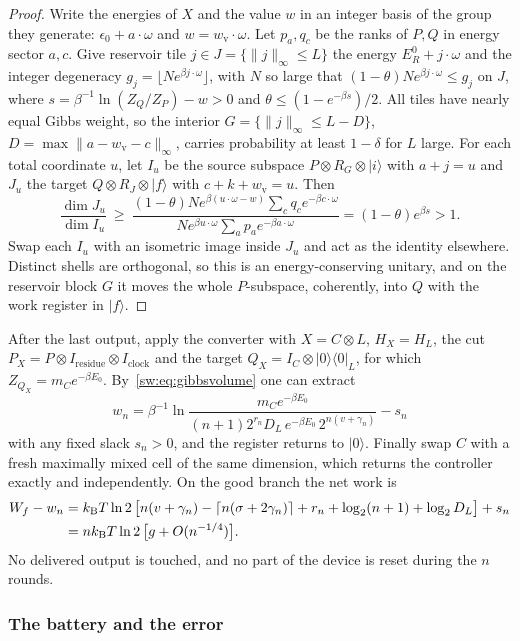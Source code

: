 \begin{proof}
Write the energies of $X$ and the value $w$ in an integer basis of the group they generate: $\epsilon_0+a\cdot\omega$ and $w=w_{\mathrm v}\cdot\omega$. Let $p_a,q_c$ be the ranks of $P,Q$ in energy sector $a,c$. Give reservoir tile $j\in J=\{\|j\|_\infty\le L\}$ the energy $E_R^0+j\cdot\omega$ and the integer degeneracy $g_j=\lfloor Ne^{\beta j\cdot\omega}\rfloor$, with $N$ so large that $(1-\theta)Ne^{\beta j\cdot\omega}\le g_j$ on $J$, where $s=\beta^{-1}\ln(Z_Q/Z_P)-w>0$ and $\theta\le(1-e^{-\beta s})/2$. All tiles have nearly equal Gibbs weight, so the interior $G=\{\|j\|_\infty\le L-D\}$, $D=\max\|a-w_{\mathrm v}-c\|_\infty$, carries probability at least $1-\delta$ for $L$ large. For each total coordinate $u$, let $I_u$ be the source subspace $P\otimes R_G\otimes|i\rangle$ with $a+j=u$ and $J_u$ the target $Q\otimes R_J\otimes|f\rangle$ with $c+k+w_{\mathrm v}=u$. Then
\[
\frac{\dim J_u}{\dim I_u}\ \ge\ \frac{(1-\theta)Ne^{\beta(u\cdot\omega-w)}\sum_cq_ce^{-\beta c\cdot\omega}}{Ne^{\beta u\cdot\omega}\sum_ap_ae^{-\beta a\cdot\omega}}=(1-\theta)e^{\beta s}>1.
\]
Swap each $I_u$ with an isometric image inside $J_u$ and act as the identity elsewhere. Distinct shells are orthogonal, so this is an energy-conserving unitary, and on the reservoir block $G$ it moves the whole $P$-subspace, coherently, into $Q$ with the work register in $|f\rangle$.
\end{proof}

After the last output, apply the converter with $X=C\otimes L$, $H_X=H_L$, the cut $P_X=P\otimes I_{\mathrm{residue}}\otimes I_{\mathrm{clock}}$ and the target $Q_X=I_C\otimes|0\rangle\langle0|_L$, for which $Z_{Q_X}=m_Ce^{-\beta E_0}$. By~\eqref{sw:eq:gibbsvolume} one can extract
\[
w_n=\beta^{-1}\ln\frac{m_Ce^{-\beta E_0}}{(n+1)2^{r_n}D_L\,e^{-\beta E_0}\,2^{n(v+\gamma_n)}}-s_n
\]
with any fixed slack $s_n>0$, and the register returns to $|0\rangle$. Finally swap $C$ with a fresh maximally mixed cell of the same dimension, which returns the controller exactly and independently. On the good branch the net work is
\begin{align*}
W_f-w_n&=k_{\mathrm B} T\ln2\,\bigl[n(v+\gamma_n)-\lceil n(\sigma+2\gamma_n)\rceil+r_n+\log_2(n+1)+\log_2D_L\bigr]+s_n\\
&=nk_{\mathrm B} T\ln2\,\bigl[g+O(n^{-1/4})\bigr].
\end{align*}
No delivered output is touched, and no part of the device is reset during the $n$ rounds.

\subsubsection{The battery and the error}

